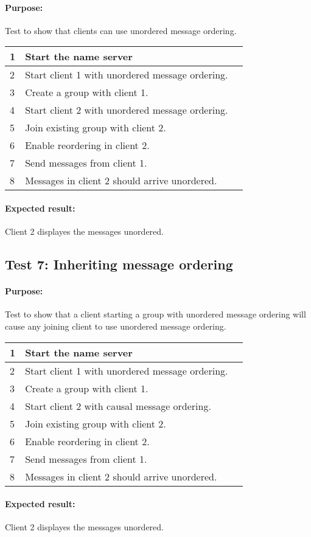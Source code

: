 \paragraph{Purpose: } Test to show that clients can use unordered message ordering.
\begin{table}[h!]
	\begin{tabularx}{\textwidth}{|l|X|p{8pt}|}
		\hline
		1 & Start the name server & \\
		\hline
		2 & Start client 1 with unordered message ordering. & \\
		\hline
		3 & Create a group with client 1. & \\
		\hline
		4 & Start client 2 with unordered message ordering. & \\
		\hline
		5 & Join existing group with client 2.& \\
		\hline
		6 & Enable reordering in client 2. & \\
		\hline
		7 & Send messages from client 1. & \\
		\hline		
		8 & Messages in client 2 should arrive unordered.&\\
		\hline		
	\end{tabularx}
\end{table}

\paragraph{Expected result:} Client 2 displayes the messages unordered.
\pagebreak

\subsection*{Test 7: Inheriting message ordering}
\paragraph{Purpose: } Test to show that a client starting a group with unordered message ordering will cause any joining client to use unordered message ordering.
\begin{table}[h!]
	\begin{tabularx}{\textwidth}{|l|X|p{8pt}|}
		\hline
		1 & Start the name server & \\
		\hline
		2 & Start client 1 with unordered message ordering. & \\
		\hline
		3 & Create a group with client 1. & \\
		\hline
		4 & Start client 2 with causal message ordering. & \\
		\hline
		5 & Join existing group with client 2.& \\
		\hline
		6 & Enable reordering in client 2. & \\
		\hline
		7 & Send messages from client 1. & \\
		\hline		
		8 & Messages in client 2 should arrive unordered. &\\
		\hline		
	\end{tabularx}
\end{table}

\paragraph{Expected result:} Client 2 displayes the messages unordered.
